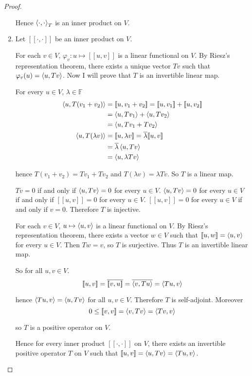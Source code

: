 \begin{proof}
\begin{enumerate}[label={(\alph*)}]
              Hence $\left\langle{\cdot,\cdot}\right\rangle_{T}$ is an inner product on $V$.
        \item Let $[\![\cdot,\cdot]\!]$ be an inner product on $V$.

              For each $v\in V$, $\varphi_{v}: u\mapsto [\![u, v]\!]$ is a linear functional on $V$. By Riesz's representation theorem, there exists a unique vector $Tv$ such that $\varphi_{v}(u) = \left\langle{u, Tv}\right\rangle$. Now I will prove that $T$ is an invertible linear map.

              For every $u\in V$, $\lambda\in\mathbb{F}$
              \begin{align*}
                  \innerprod{u, T(v_{1} + v_{2})} & = [\![u, v_{1} + v_{2}]\!] = [\![u, v_{1}]\!] + [\![u, v_{2}]\!] \\
                                                  & = \innerprod{u, Tv_{1}} + \innerprod{u, Tv_{2}}                  \\
                                                  & = \innerprod{u, Tv_{1} + Tv_{2}}                                 \\
                  \innerprod{u, T(\lambda v)}     & = [\![u, \lambda v]\!] = \conj{\lambda}[\![u, v]\!]              \\
                                                  & = \conj{\lambda}\innerprod{u, Tv}                                \\
                                                  & = \innerprod{u, \lambda Tv}
              \end{align*}

              hence $T(v_{1} + v_{2}) = Tv_{1} + Tv_{2}$ and $T(\lambda v) = \lambda Tv$. So $T$ is a linear map.

              $Tv = 0$ if and only if $\left\langle{u, Tv}\right\rangle = 0$ for every $u\in V$. $\left\langle{u, Tv}\right\rangle = 0$ for every $u\in V$ if and only if $[\![u, v]\!] = 0$ for every $u\in V$. $[\![u, v]\!] = 0$ for every $u\in V$ if and only if $v = 0$. Therefore $T$ is injective.

              For each $v\in V$, $u\mapsto \left\langle{u, v}\right\rangle$ is a linear functional on $V$. By Riesz's representation theorem, there exists a vector $w\in V$ such that $[\![u, w]\!] = \left\langle{u, v}\right\rangle$ for every $u\in V$. Then $Tw = v$, so $T$ is surjective. Thus $T$ is an invertible linear map.

              So for all $u, v\in V$.
              \[
                  [\![u, v]\!] = \overline{[\![v, u]\!]} = \overline{\left\langle{v, Tu}\right\rangle} = \left\langle{Tu, v}\right\rangle
              \]

              hence $\left\langle{Tu, v}\right\rangle = \left\langle{u, Tv}\right\rangle$ for all $u, v\in V$. Therefore $T$ is self-adjoint. Moreover
              \[
                  0\leq [\![v,v]\!] = \left\langle{v, Tv}\right\rangle = \left\langle{Tv, v}\right\rangle
              \]

              so $T$ is a positive operator on $V$.

              Hence for every inner product $[\![\cdot, \cdot]\!]$ on $V$, there exists an invertible positive operator $T$ on $V$ such that $[\![u, v]\!] = \left\langle{u, Tv}\right\rangle = \left\langle{Tu, v}\right\rangle$.
    \end{enumerate}
\end{proof}
